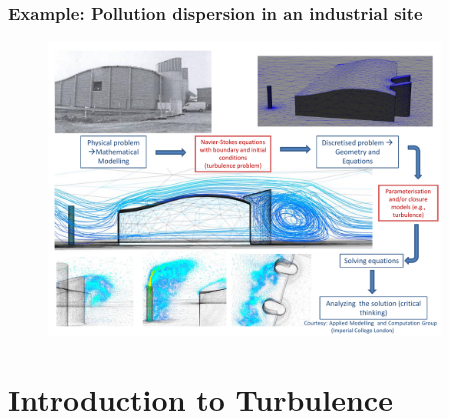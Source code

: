 \documentclass[10pt,compress]{beamer}
\begin{document}
\begin{frame}
 \frametitle{Example: Pollution dispersion in an industrial site}

   \begin{figure}%
    \begin{center}
     \includegraphics[width=12.cm, height=7.8cm, clip]{./Figs/SpecificIndustrialEnvironmentalApplication.pdf}
    \end{center}
   \end{figure}    
\end{frame}



\section{Introduction to Turbulence}
\end{document}
